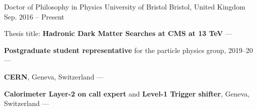 
\begin{cventries}
    \cventry
        {Doctor of Philosophy in Physics} %
        {University of Bristol} %
        {Bristol, United Kingdom} %
        {Sep. 2016 -- Present} %
        {
        \begin{cvitems} %
            \item {Thesis title: \textbf{Hadronic Dark Matter Searches at CMS at 13 TeV} --- }
            \vspace{0.5mm}
            \item {\textbf{Postgraduate student representative} for the particle physics group, 2019--20 --- } %
            \vspace{0.5mm}
            \item {\textbf{CERN}, Geneva, Switzerland --- }
            \item {\textbf{Calorimeter Layer-2 on call expert} and \textbf{Level-1 Trigger shifter}, Geneva, Switzerland --- }
        \end{cvitems}
        }


\end{cventries}
